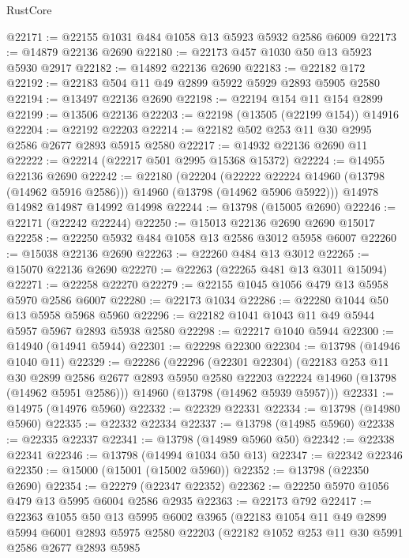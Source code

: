 \begin{lexlean}{RustCore}
\begin{coremodule}
@22171 := @22155 @1031 @484 @1058 @13 @5923 @5932 @2586 @6009
@22173 := @14879 @22136 @2690
@22180 := @22173 @457 @1030 @50 @13 @5923 @5930 @2917
@22182 := @14892 @22136 @2690
@22183 := @22182 @172
@22192 := @22183 @504 @11 @49 @2899 @5922 @5929 @2893 @5905 @2580
@22194 := @13497 @22136 @2690
@22198 := @22194 @154 @11 @154 @2899
@22199 := @13506 @22136
@22203 := @22198 (@13505 (@22199 @154)) @14916
@22204 := @22192 @22203
@22214 := @22182 @502 @253 @11 @30 @2995 @2586 @2677 @2893 @5915 @2580
@22217 := @14932 @22136 @2690 @11
@22222 := @22214 (@22217 @501 @2995 @15368 @15372)
@22224 := @14955 @22136 @2690
@22242 := @22180
    (@22204
      (@22222 @22224 @14960 (@13798 (@14962 @5916 @2586)))
      @14960
      (@13798 (@14962 @5906 @5922)))
    @14978
    @14982
    @14987
    @14992
    @14998
@22244 := @13798 (@15005 @2690)
@22246 := @22171 (@22242 @22244)
@22250 := @15013 @22136 @2690 @2690 @15017
@22258 := @22250 @5932 @484 @1058 @13 @2586 @3012 @5958 @6007
@22260 := @15038 @22136 @2690
@22263 := @22260 @484 @13 @3012
@22265 := @15070 @22136 @2690
@22270 := @22263 (@22265 @481 @13 @3011 @15094)
@22271 := @22258 @22270
@22279 := @22155 @1045 @1056 @479 @13 @5958 @5970 @2586 @6007
@22280 := @22173 @1034
@22286 := @22280 @1044 @50 @13 @5958 @5968 @5960
@22296 := @22182 @1041 @1043 @11 @49 @5944 @5957 @5967 @2893 @5938 @2580
@22298 := @22217 @1040 @5944
@22300 := @14940 (@14941 @5944)
@22301 := @22298 @22300
@22304 := @13798 (@14946 @1040 @11)
@22329 := @22286
    (@22296
      (@22301 @22304)
      (@22183
        @253
        @11
        @30
        @2899
        @2586
        @2677
        @2893
        @5950
        @2580
        @22203
        @22224
        @14960
        (@13798 (@14962 @5951 @2586)))
      @14960
      (@13798 (@14962 @5939 @5957)))
@22331 := @14975 (@14976 @5960)
@22332 := @22329 @22331
@22334 := @13798 (@14980 @5960)
@22335 := @22332 @22334
@22337 := @13798 (@14985 @5960)
@22338 := @22335 @22337
@22341 := @13798 (@14989 @5960 @50)
@22342 := @22338 @22341
@22346 := @13798 (@14994 @1034 @50 @13)
@22347 := @22342 @22346
@22350 := @15000 (@15001 (@15002 @5960))
@22352 := @13798 (@22350 @2690)
@22354 := @22279 (@22347 @22352)
@22362 := @22250 @5970 @1056 @479 @13 @5995 @6004 @2586 @2935
@22363 := @22173 @792
@22417 := @22363
    @1055
    @50
    @13
    @5995
    @6002
    @3965
    (@22183
      @1054
      @11
      @49
      @2899
      @5994
      @6001
      @2893
      @5975
      @2580
      @22203
      (@22182
        @1052
        @253
        @11
        @30
        @5991
        @2586
        @2677
        @2893
        @5985

\end{coremodule}
\end{lexlean}
